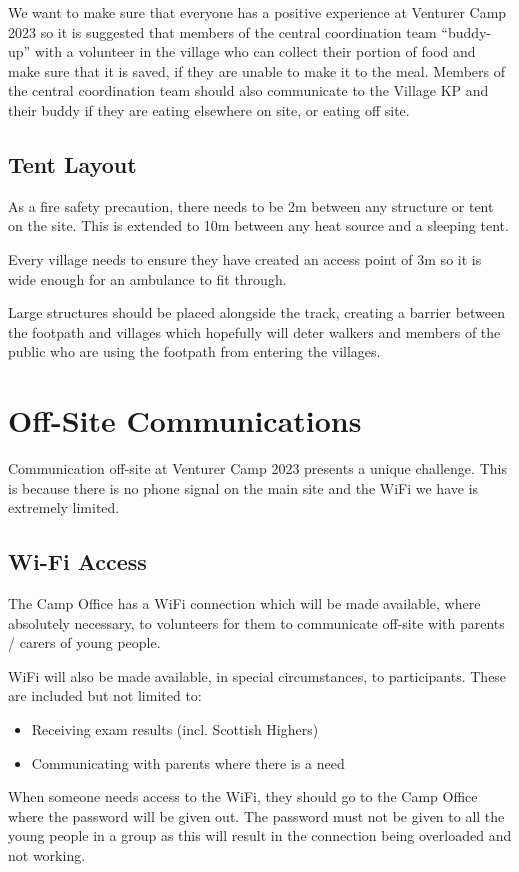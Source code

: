 \documentclass[a4paper, 11pt]{report}
\begin{document}
We want to make sure that everyone has a positive experience at Venturer Camp 2023 so it is suggested that members of the central coordination team ``buddy-up'' with a volunteer in the village who can collect their portion of food and make sure that it is saved, if they are unable to make it to the meal. Members of the central coordination team should also communicate to the Village KP and their buddy if they are eating elsewhere on site, or eating off site. 

\section{Tent Layout}
As a fire safety precaution, there needs to be 2m between any structure or tent on the site. This is extended to 10m between any heat source and a sleeping tent. \nl

Every village needs to ensure they have created an access point of 3m so it is wide enough for an ambulance to fit through. \nl

Large structures should be placed alongside the track, creating a barrier between the footpath and villages which hopefully will deter walkers and members of the public who are using the footpath from entering the villages. 

\chapter{Off-Site Communications}
Communication off-site at Venturer Camp 2023 presents a unique challenge. This is because there is no phone signal on the main site and the WiFi we have is extremely limited.
\section{Wi-Fi Access}
The Camp Office has a WiFi connection which will be made available, where absolutely necessary, to volunteers for them to communicate off-site with parents / carers of young people. \nl

WiFi will also be made available, in special circumstances, to participants. These are included but not limited to:
\begin{itemize}
    \item Receiving exam results (incl. Scottish Highers)
    \item Communicating with parents where there is a need
\end{itemize}

When someone needs access to the WiFi, they should go to the Camp Office where the password will be given out. The password must not be given to all the young people in a group as this will result in the connection being overloaded and not working.\nl
\end{document}
